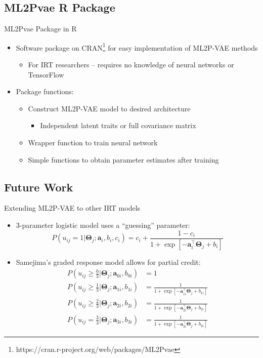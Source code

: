 \documentclass{beamer}
\newcommand{\vect}[1]{\boldsymbol{#1}}
\theoremstyle{definition}
\begin{document}
\subsection{ML2Pvae R Package}
\begin{frame}{ML2Pvae Package in R}
\begin{itemize}
  \item Software package on CRAN\footnote{https://cran.r-project.org/web/packages/ML2Pvae} for easy implementation of ML2P-VAE methods
    \begin{itemize}
      \item For IRT researchers -- requires no knowledge of neural networks or TensorFlow
    \end{itemize}
  \item<2-> Package functions:
  \begin{itemize}
    \item<2-> Construct ML2P-VAE model to desired architecture
      \begin{itemize}
        \item<2-> Independent latent traits or full covariance matrix
      \end{itemize}
    \item<2-> Wrapper function to train neural network
    \item<2-> Simple functions to obtain parameter estimates after training
  \end{itemize}
\end{itemize}
\end{frame}


\subsection{Future Work}

\begin{frame}{Extending ML2P-VAE to other IRT models}
  \begin{itemize}
    \item 3-parameter logistic model uses a ``guessing'' parameter:
      \[P(u_{ij} = 1 | \vect \Theta_j; \vect a_i, b_i, c_i) = c_i + \frac{1-c_i}{1 + \exp\left[-\vect a_i^\top \vect \Theta_j + b_i \right]}\]
    \item<2-> Samejima's graded response model allows for partial credit:
      {\small
      \begin{align*}
        P(u_{ij} \geq \frac{0}{3} | \vect \Theta_j; \vect a_{0i}, b_{0i}) &= 1\\
        P(u_{ij} \geq \frac{1}{3} | \vect \Theta_j; \vect a_{1i}, b_{1i}) &= \frac{1}{1 + \exp\left[-\vect a_{1i}^\top \vect \Theta_j + b_{1i} \right]} \\ 
        P(u_{ij} \geq \frac{2}{3} | \vect \Theta_j; \vect a_{2i}, b_{2i}) &= \frac{1}{1 + \exp\left[-\vect a_{2i}^\top \vect \Theta_j + b_{2i} \right]} \\ 
        P(u_{ij} = \frac{3}{3} | \vect \Theta_j; \vect a_{3i}, b_{3i}) &= \frac{1}{1 + \exp\left[-\vect a_{3i}^\top \vect \Theta_j + b_{3i} \right]} 
      \end{align*}
    }
  \end{itemize}
\end{frame}
\end{document}
